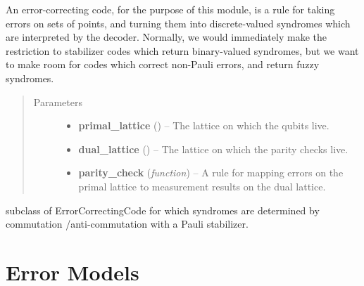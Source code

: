 \documentclass[letterpaper,10pt,english]{sphinxmanual}
\begin{document}
\begin{fulllineitems}
\label{code:py_qcode.ErrorCorrectingCode}
An error-correcting code, for the purpose of this module, is a rule
for taking errors on sets of points, and turning them into
discrete-valued syndromes which are interpreted by the decoder.
Normally, we would immediately make the restriction to stabilizer
codes which return binary-valued syndromes, but we want to make
room for codes which correct non-Pauli errors, and return fuzzy
syndromes.
\begin{quote}\begin{description}
\item[{Parameters}] \leavevmode\begin{itemize}
\item {} 
\textbf{primal\_lattice} ({\hyperref[lattice:py_qcode.Lattice]{}}) -- The lattice on which the qubits live.

\item {} 
\textbf{dual\_lattice} ({\hyperref[lattice:py_qcode.Lattice]{}}) -- The lattice on which the parity checks live.

\item {} 
\textbf{parity\_check} (\emph{function}) -- A rule for mapping errors on the primal lattice to measurement results on the dual lattice.

\end{itemize}

\end{description}\end{quote}

\end{fulllineitems}


\begin{fulllineitems}
\label{code:py_qcode.StabilizerCode}
subclass of
ErrorCorrectingCode for which syndromes are determined by commutation
/anti-commutation with a Pauli stabilizer.

\end{fulllineitems}



\chapter{Error Models}
\label{error:error-models}\label{error::doc}
\end{document}
